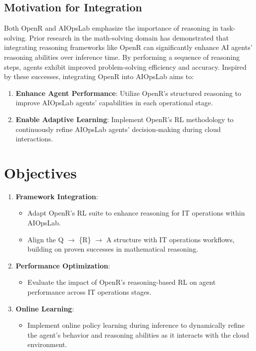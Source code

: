 \documentclass[conference]{IEEEtran}
\begin{document}
\subsection{Motivation for Integration}
Both OpenR and AIOpsLab emphasize the importance of reasoning in task-solving. 
Prior research in the math-solving domain has demonstrated that integrating reasoning frameworks like OpenR can significantly enhance AI agents' reasoning abilities over inference time. 
By performing a sequence of reasoning steps, agents exhibit improved problem-solving efficiency and accuracy. 
Inspired by these successes, integrating OpenR into AIOpsLab aims to:
\begin{enumerate}
    \item \textbf{Enhance Agent Performance}: Utilize OpenR's structured reasoning to improve AIOpsLab agents' capabilities in each operational stage.
    \item \textbf{Enable Adaptive Learning}: Implement OpenR's RL methodology to continuously refine AIOpsLab agents' decision-making during cloud interactions.
\end{enumerate}

\section{Objectives}
\begin{enumerate}
    \item \textbf{Framework Integration}:
    \begin{itemize}
        \item Adapt OpenR's RL suite to enhance reasoning for IT operations within AIOpsLab.
        \item Align the Q $\rightarrow$ \{R\} $\rightarrow$ A structure with IT operations workflows, building on proven successes in mathematical reasoning.
    \end{itemize}
    
    \item \textbf{Performance Optimization}:
    \begin{itemize}
        \item Evaluate the impact of OpenR's reasoning-based RL on agent performance across IT operations stages.
    \end{itemize}
    
    \item \textbf{Online Learning}:
    \begin{itemize}
        \item Implement online policy learning during inference to dynamically refine the agent's behavior and reasoning abilities as it interacts with the cloud environment.
    \end{itemize}
    
\end{enumerate}
\end{document}
